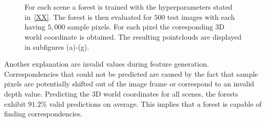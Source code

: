 \documentclass[final]{cvpr}
\begin{document}
\begin{figure}[h!]
	\begin{center}
	
	\,
	\,
	\\
	\,
	\,

	\end{center}
	\caption{For each scene a forest is trained with the hyperparameters stated in~\ref{XX}. The forest 
	is then evaluated for $500$ test images with each having $5,000$ sample pixels. For each pixel the coresponding
	3D world coordinate is obtained. The resulting pointclouds are displayed in subfigures (a)-(g). }
	\label{fig:pointclouds}
	\label{fig:onecol}
\end{figure}

Another explanation are invalid values during feature generation. Correspondencies that could not be predicted are
caused by the fact that sample pixels are potentially shifted out of the image frame or correspond to an invalid depth value. 
Predicting the 3D world coordinates for all scenes, the forests exhibit $91.2\%$ valid predictions on average. 
This implies that a forest is capable of finding correspondencies.
\end{document}
